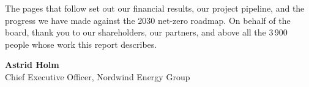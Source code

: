 \documentclass[11pt]{article}
\begin{document}
The pages that follow set out our financial results, our project pipeline,
and the progress we have made against the 2030 net-zero roadmap. On behalf
of the board, thank you to our shareholders, our partners, and above all the
3\,900 people whose work this report describes.

\vspace{0.8em}
\textbf{Astrid Holm}\\
Chief Executive Officer, Nordwind Energy Group
\end{document}
